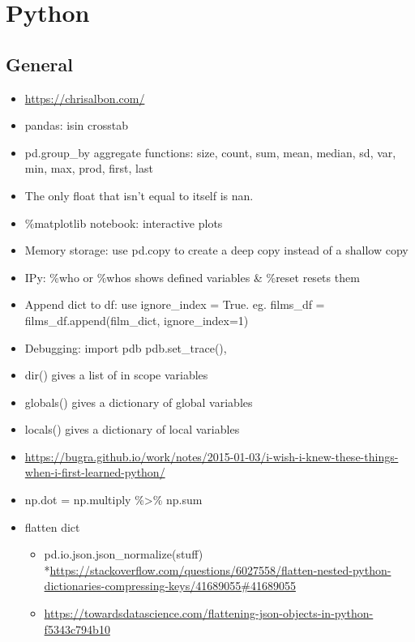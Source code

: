 \documentclass[]{book}
\providecommand{\tightlist}{%
  \setlength{\itemsep}{0pt}\setlength{\parskip}{0pt}}
\theoremstyle{definition}
\theoremstyle{definition}
\theoremstyle{definition}
\theoremstyle{remark}
\begin{document}
\section{Python}\label{python}

\subsection{General}\label{general-5}

\begin{itemize}
\item
  \url{https://chrisalbon.com/}
\item
  pandas: isin \textbar{} crosstab
\item
  pd.group\_by aggregate functions: size, count, sum, mean, median, sd,
  var, min, max, prod, first, last
\item
  The only float that isn't equal to itself is nan.
\item
  \%matplotlib notebook: interactive plots
\item
  Memory storage: use pd.copy to create a deep copy instead of a shallow
  copy
\item
  IPy: \%who or \%whos shows defined variables \& \%reset resets them
\item
  Append dict to df: use ignore\_index = True. eg. films\_df =
  films\_df.append(film\_dict, ignore\_index=1)
\item
  Debugging: import pdb \textbar{} pdb.set\_trace(),
\item
  dir() gives a list of in scope variables
\item
  globals() gives a dictionary of global variables
\item
  locals() gives a dictionary of local variables
\item
  \url{https://bugra.github.io/work/notes/2015-01-03/i-wish-i-knew-these-things-when-i-first-learned-python/}
\item
  np.dot = np.multiply \%\textgreater{}\% np.sum
\item
  flatten dict

  \begin{itemize}
  \tightlist
  \item
    pd.io.json.json\_normalize(stuff)
    *\url{https://stackoverflow.com/questions/6027558/flatten-nested-python-dictionaries-compressing-keys/41689055\#41689055}
  \item
    \url{https://towardsdatascience.com/flattening-json-objects-in-python-f5343c794b10}
  \end{itemize}
\end{itemize}
\end{document}
